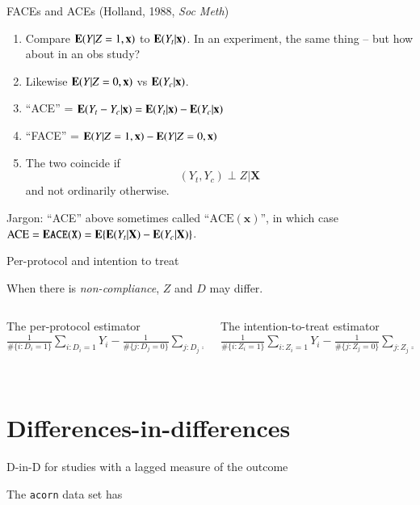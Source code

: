 \begin{frame}{FACEs and ACEs (Holland, 1988, \textit{Soc Meth}) }
  \begin{enumerate}[<+->]
  \item   Compare $\mathbf{E}(Y | Z=1, \mathbf{x})$ to $\mathbf{E}(Y_{t}| \mathbf{x})$.  In
  an experiment, the same thing -- but how about in an obs study?
\item Likewise  $\mathbf{E}(Y | Z=0, \mathbf{x})$ vs $\mathbf{E}(Y_{c}| \mathbf{x})$.
\item ``ACE'' = $\mathbf{E}(Y_t - Y_c| \mathbf{x}) = \mathbf{E}(Y_{t}| \mathbf{x}) - \mathbf{E}(Y_{c}| \mathbf{x})$
\item ``FACE'' = $\mathbf{E}(Y | Z=1, \mathbf{x}) - \mathbf{E}(Y | Z=0, \mathbf{x})$
\item The two coincide if
$$ (Y_{t}, Y_{c}) \perp Z | \mathbf{X}$$
and not ordinarily otherwise.
  \end{enumerate}

Jargon:
``ACE'' above sometimes called ``$\mathrm{ACE}(\mathbf{x})$'',
  in which case $\mathrm{ACE} = \mathbf{E}\mathtt{ACE}(\mathtt{X}) = \mathbf{E}\{ \mathbf{E}(Y_{t}|\mathbf{X}) -
  \mathbf{E}(Y_{c}|\mathbf{X}) \}$.


\end{frame}

\begin{frame}{Per-protocol and intention to treat}

When there is \textit{non-compliance}, $Z$ and $D$ may differ.  \pause  

  \begin{columns}
    \begin{Column}
  { The per-protocol estimator} \\      
$\frac{1}{\# \{i: D_i = 1\}} \sum_{i:D_i=1} Y_i - \frac{1}{\# \{j: D_j = 0\}} \sum_{j:D_j=0} Y_j$
\vspace{.6\textheight} 
\mbox{ }
    \end{Column}
    \begin{Column}
  { The intention-to-treat estimator} \\      
$\frac{1}{\# \{i: Z_i = 1\}} \sum_{i:Z_i=1} Y_i - \frac{1}{\# \{j: Z_j = 0\}} \sum_{j:Z_j=0} Y_j$
\vspace{.6\textheight} 
\mbox{ }

    \end{Column}

  \end{columns}
\end{frame}

\section{Differences-in-differences}

\begin{frame}{D-in-D for studies with a lagged measure of the outcome}

The \texttt{acorn} data set has

  

\end{frame}


